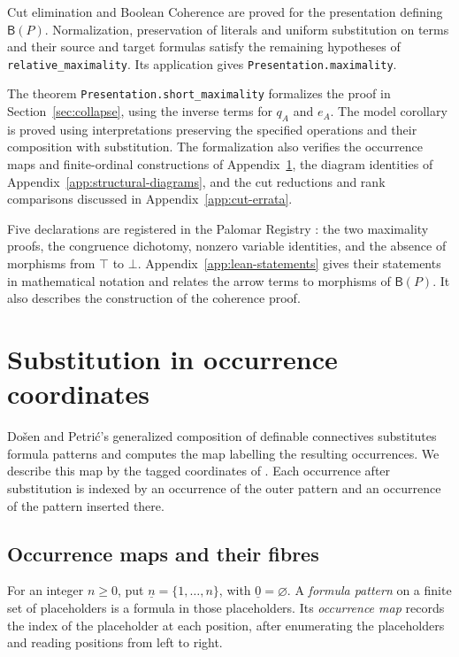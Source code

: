 \documentclass[11pt]{article}
\newcommand{\B}{\mathsf B}
\begin{document}
Cut elimination and Boolean Coherence are proved for the presentation
defining $\B(P)$. Normalization, preservation of literals and
uniform substitution on terms and their source and target formulas
satisfy the remaining hypotheses of \texttt{relative\_maximality}.
Its application gives \texttt{Presentation.maximality}.

The theorem \texttt{Presentation.short\_maximality} formalizes the proof
in Section~\ref{sec:collapse}, using the inverse terms for $q_A$ and $e_A$.
The model corollary is proved using interpretations preserving the
specified operations and their composition with substitution. The formalization
also verifies the occurrence maps and finite-ordinal constructions of
Appendix~\ref{app:substitution}, the diagram identities of
Appendix~\ref{app:structural-diagrams}, and the cut reductions and rank
comparisons discussed in Appendix~\ref{app:cut-errata}.

Five declarations are registered in the Palomar Registry
\cite{palomar-2026-10-30-000014-v2}:
the two maximality proofs, the congruence dichotomy, nonzero variable
identities, and the absence of morphisms from $\top$ to $\bot$.
Appendix~\ref{app:lean-statements} gives their statements in mathematical
notation and relates the arrow terms to morphisms of $\B(P)$.
It also describes the construction of the coherence proof.

\appendix
\section{Substitution in occurrence coordinates}\label{app:substitution}

Do\v{s}en and Petri\'c's generalized composition of definable
connectives \cite[\S2.5, pp.~45--46]{DP} substitutes formula
patterns and computes the map labelling the resulting occurrences.
We describe this map by the tagged coordinates of
\cite[\S\S9.2--9.3]{Notation}. Each occurrence after substitution
is indexed by an occurrence of the outer pattern and an occurrence
of the pattern inserted there.

\subsection{Occurrence maps and their fibres}\label{app:profiles}

For an integer $n\geq0$, put $\underline n=\{1,\ldots,n\}$, with
$\underline0=\varnothing$. A \emph{formula pattern} on a finite set
of placeholders is a formula in those placeholders. Its
\emph{occurrence map} records the index of the placeholder at each position,
after enumerating the placeholders and reading positions from left to right.
\end{document}
